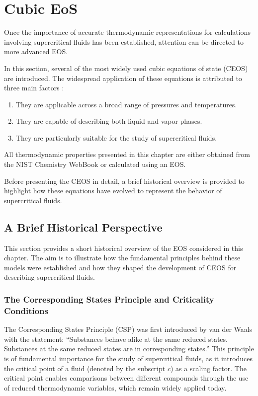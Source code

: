 			
\section{Cubic EoS}

Once the importance of accurate thermodynamic representations for calculations
involving supercritical fluids has been established, attention can be directed
to more advanced EOS.  

In this section, several of the most widely used cubic equations of state (CEOS)
are introduced. The widespread application of these equations is attributed to
three main factors \cite{tosun2021thermodynamics,poling2001properties}:  

\begin{enumerate}
    \item They are applicable across a broad range of pressures and
    temperatures.  
    \item They are capable of describing both liquid and vapor phases.  
    \item They are particularly suitable for the study of supercritical fluids.  
\end{enumerate}

All thermodynamic properties presented in this chapter are either obtained from
the NIST Chemistry WebBook \cite{burgess2012thermochemical} or calculated using
an EOS.  

Before presenting the CEOS in detail, a brief historical overview is provided to
highlight how these equations have evolved to represent the behavior of
supercritical fluids.  

		
\subsection{A Brief Historical Perspective}

This section provides a short historical overview of the EOS considered in this
chapter. The aim is to illustrate how the fundamental principles behind these
models were established and how they shaped the development of CEOS for
describing supercritical fluids.  

\subsubsection{The Corresponding States Principle and Criticality Conditions}
The Corresponding States Principle (CSP) was first introduced by van der Waals
with the statement: ``Substances behave alike at the same reduced states.
Substances at the same reduced states are in corresponding states.'' This
principle is of fundamental importance for the study of supercritical fluids, as
it introduces the critical point of a fluid (denoted by the subscript $c$) as a
scaling factor. The critical point enables comparisons between different
compounds through the use of reduced thermodynamic variables, which remain
widely applied today.  

